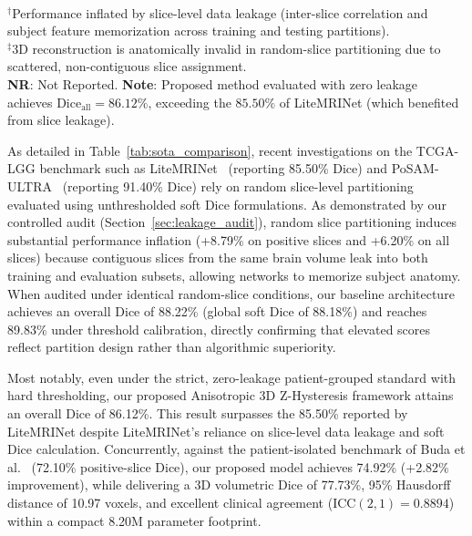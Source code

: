 \documentclass[preprint,3p,times,onecolumn]{elsarticle}
\begin{document}
\begin{table}[tbp]
\begin{tabular*}{\textwidth}{@{\extracolsep{\fill}}lccccccc}
\bottomrule
\end{tabular*}
\\[4pt]
\begin{minipage}{\textwidth}
\scriptsize
$^\dagger$Performance inflated by slice-level data leakage (inter-slice correlation and subject feature memorization across training and testing partitions).\\[2pt]
$^\ddagger$3D reconstruction is anatomically invalid in random-slice partitioning due to scattered, non-contiguous slice assignment.\\[2pt]
\textbf{NR}: Not Reported. \textbf{Note}: Proposed method evaluated with zero leakage achieves $\text{Dice}_{\text{all}} = 86.12\%$, exceeding the $85.50\%$ of LiteMRINet (which benefited from slice leakage).
\end{minipage}
\end{table}

As detailed in Table~\ref{tab:sota_comparison}, recent investigations on the TCGA-LGG benchmark such as LiteMRINet~\cite{yuan2025enhanced} (reporting 85.50\% Dice) and PoSAM-ULTRA~\cite{alhatamleh2026attention} (reporting 91.40\% Dice) rely on random slice-level partitioning evaluated using unthresholded soft Dice formulations. As demonstrated by our controlled audit (Section~\ref{sec:leakage_audit}), random slice partitioning induces substantial performance inflation (+8.79\% on positive slices and +6.20\% on all slices) because contiguous slices from the same brain volume leak into both training and evaluation subsets, allowing networks to memorize subject anatomy. When audited under identical random-slice conditions, our baseline architecture achieves an overall Dice of 88.22\% (global soft Dice of 88.18\%) and reaches 89.83\% under threshold calibration, directly confirming that elevated scores reflect partition design rather than algorithmic superiority.

Most notably, even under the strict, zero-leakage patient-grouped standard with hard thresholding, our proposed Anisotropic 3D Z-Hysteresis framework attains an overall Dice of 86.12\%. This result surpasses the 85.50\% reported by LiteMRINet despite LiteMRINet's reliance on slice-level data leakage and soft Dice calculation. Concurrently, against the patient-isolated benchmark of Buda et al.~\cite{buda2019association} (72.10\% positive-slice Dice), our proposed model achieves 74.92\% (+2.82\% improvement), while delivering a 3D volumetric Dice of 77.73\%, 95\% Hausdorff distance of 10.97 voxels, and excellent clinical agreement ($\text{ICC}(2, 1) = 0.8894$) within a compact 8.20M parameter footprint.
\end{document}
